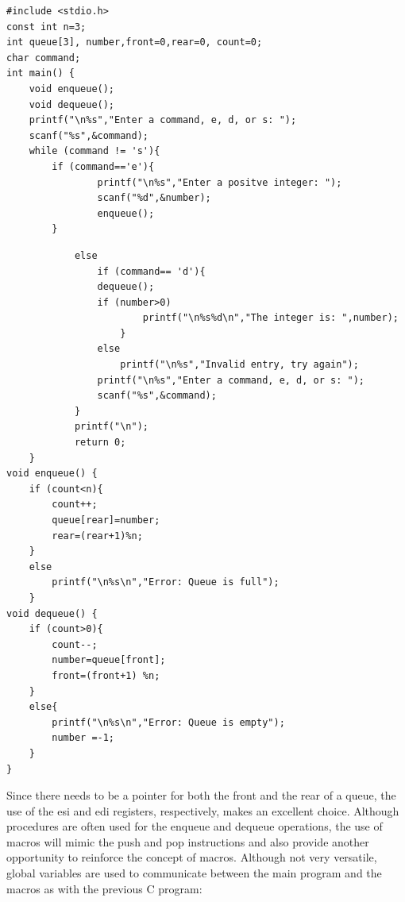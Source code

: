 \documentclass[10pt]{book}
\begin{document}
\begin{verbatim}
#include <stdio.h>
const int n=3;
int queue[3], number,front=0,rear=0, count=0;
char command;
int main() {
    void enqueue();
    void dequeue();
    printf("\n%s","Enter a command, e, d, or s: ");
    scanf("%s",&command);
    while (command != 's'){
        if (command=='e'){
                printf("\n%s","Enter a positve integer: ");
                scanf("%d",&number);
                enqueue();
        }
\end{verbatim}

\begin{verbatim}
            else
                if (command== 'd'){
                dequeue();
                if (number>0)
                        printf("\n%s%d\n","The integer is: ",number);
                    }
                else
                    printf("\n%s","Invalid entry, try again");
                printf("\n%s","Enter a command, e, d, or s: ");
                scanf("%s",&command);
            }
            printf("\n");
            return 0;
    }
void enqueue() {
    if (count<n){
        count++;
        queue[rear]=number;
        rear=(rear+1)%n;
    }
    else
        printf("\n%s\n","Error: Queue is full");
    }
void dequeue() {
    if (count>0){
        count--;
        number=queue[front];
        front=(front+1) %n;
    }
    else{
        printf("\n%s\n","Error: Queue is empty");
        number =-1;
    }
}
\end{verbatim}

Since there needs to be a pointer for both the front and the rear of a queue, the use of the esi and edi registers, respectively, makes an excellent choice. Although procedures are often used for the enqueue and dequeue operations, the use of macros will mimic the push and pop instructions and also provide another opportunity to reinforce the concept of macros. Although not very versatile, global variables are used to communicate between the main program and the macros as with the previous C program:
\end{document}
